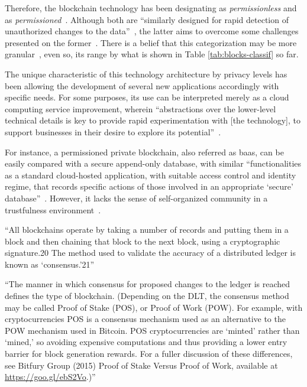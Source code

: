 Therefore, the blockchain technology has been designating as \emph{permissionless} and as \emph{permissioned}~\cite{itu2017,peck2017}.
Although both are ``similarly designed for rapid detection of unauthorized changes to the data''~\cite{itu2017},
the latter aims to overcome some challenges presented on the former~\cite{peck2017}.
There is a belief that this categorization may be more granular~\cite{itu2017},
even so, its range by what is shown in Table \ref{tab:blocks-classif} so far.

The unique characteristic of this technology architecture by privacy levels has been allowing the development of several new applications accordingly with specific needs.
For some purposes, its use can be interpreted merely as a cloud computing service improvement,
wherein ``abstractions over the lower-level technical details is key to provide rapid experimentation with [the technology], to support businesses in their desire to explore its potential''~\cite{singh2017}.

For instance, a permissioned private blockchain, also referred as \acrfull{baas}, can be easily compared with a secure append-only database,
with similar ``functionalities as a standard cloud-hosted application, with suitable access control and identity regime, that records specific actions of those involved in an appropriate `secure' database''~\cite{singh2017}.
However, it lacks the sense of self-organized community in a trustfulness environment~\cite{peck2017}.


``All blockchains operate by taking a number of records and putting them in a block and then chaining that block to the next block, using a cryptographic signature.20 The method used to validate the accuracy of a distributed ledger is known as ‘consensus.’21''~\cite{itu2017}

``The manner in which consensus for proposed changes to the ledger is reached defines the type of blockchain. (Depending on the DLT, the consensus method may be called Proof of Stake (POS), or Proof of Work (POW). For example, with cryptocurrencies POS is a consensus mechanism used as an alternative to the POW mechanism used in Bitcoin. POS cryptocurrencies are ‘minted’ rather than ‘mined,’ so avoiding expensive computations and thus providing a lower entry barrier for block generation rewards. For a fuller discussion of these differences, see Bitfury Group (2015) Proof of Stake Versus Proof of Work, available at \url{https://goo.gl/ebS2Vo}.)''~\cite{itu2017}


